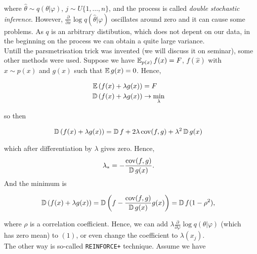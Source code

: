 where $\widehat{\theta} \sim q(\theta | \varphi)$, $j \sim U\{1, \ldots, n\}$, and the process is called \textit{double stochastic inference}. However, $\frac{\partial}{\partial x} \log q(\widehat{\theta} | \varphi)$ oscillates around zero and it can cause some problems. As $q$ is an arbitrary distibution, which does not depent on our data, in the beginning on the process we can obtain a quite large variance. \\ 

Untill the parsmetrisation trick was invented (we will discuss it on seminar), some other methods were used. Suppose we have $\operatorname{\mathbb{E}}_{p(x)} f(x) = F$, $f(\widehat{x})$ with $\widehat{x} \sim p(x)$ and $g(x)$ such that $\operatorname{\mathbb{E}} g(x) = 0$. Hence, 

\begin{equation*}
    \begin{aligned}
        \operatorname{\mathbb{E}}\left( f(x) + \lambda g(x)\right) &= F \\ 
        \operatorname{\mathbb{D}} \left( f(x) + \lambda g(x) \right) &\to \min_\lambda
    \end{aligned}
\end{equation*}

so then

\begin{equation*}
    \begin{aligned}
        \operatorname{\mathbb{D}} \left( f(x) + \lambda g(x)\right) = \operatorname{\mathbb{D}} f + 2 \lambda \operatorname{cov}(f, g) + \lambda^2 \operatorname{\mathbb{D}} g(x) 
    \end{aligned}
\end{equation*}

which after differentiation by $\lambda$ gives zero. Hence, $$\lambda_* = - \frac{\operatorname{cov}(f, g)}{\operatorname{\mathbb{D}} g(x)}.$$ And the minimum is

\begin{equation*}
    \begin{aligned}
        \operatorname{\mathbb{D}} \left( f(x) + \lambda g(x)\right) = \operatorname{\mathbb{D}} \left( f - \frac{\operatorname{cov}(f, g)}{\operatorname{\mathbb{D}} g(x)} g(x) \right)= \operatorname{\mathbb{D}} f (1 - \rho^2),
    \end{aligned}
\end{equation*}

where $\rho$ is a correlation coefficient. Hence, we can add $\lambda \frac{\partial}{\partial \varphi} \log q(\theta | \varphi)$ (which has zero mean) to $(1)$, or even change the coefficient to $\lambda(x_j)$. \\ 

The other way is so-called \texttt{REINFORCE+} technique. Assume we have 

